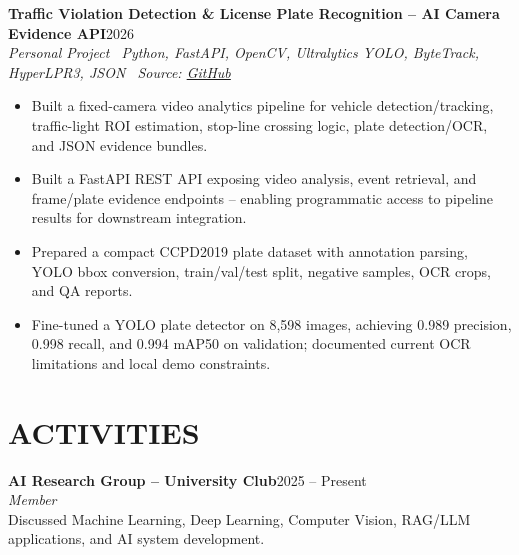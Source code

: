 \documentclass[10pt,a4paper]{article}
\newenvironment{cvitems}{%
    \begin{itemize}[leftmargin=1.2em,itemsep=0pt,topsep=1pt,parsep=0pt]
}{%
    \end{itemize}
}
\newcommand{\entryhead}[2]{%
    \noindent\textbf{#1}\hfill #2\\[-2pt]
}
\newcommand{\entrysub}[1]{%
    \noindent\textit{#1}\\[-1pt]
}
\begin{document}
\entryhead{Traffic Violation Detection \& License Plate Recognition -- AI Camera Evidence API}{2026}
\entrysub{Personal Project \textbar\ Python, FastAPI, OpenCV, Ultralytics YOLO, ByteTrack, HyperLPR3, JSON \textbar\ Source: \href{https://github.com/NguyenKhacBao564/Traffic-Violation-Detection-and-License-Plate-Recognition}{GitHub}}
\begin{cvitems}
    \item Built a fixed-camera video analytics pipeline for vehicle detection/tracking, traffic-light ROI estimation, stop-line crossing logic, plate detection/OCR, and JSON evidence bundles.
    \item Built a FastAPI REST API exposing video analysis, event retrieval, and frame/plate evidence endpoints -- enabling programmatic access to pipeline results for downstream integration.
    \item Prepared a compact CCPD2019 plate dataset with annotation parsing, YOLO bbox conversion, train/val/test split, negative samples, OCR crops, and QA reports.
    \item Fine-tuned a YOLO plate detector on 8,598 images, achieving 0.989 precision, 0.998 recall, and 0.994 mAP50 on validation; documented current OCR limitations and local demo constraints.
\end{cvitems}

\section{ACTIVITIES}
\entryhead{AI Research Group -- University Club}{2025 -- Present}
\entrysub{Member}
Discussed Machine Learning, Deep Learning, Computer Vision, RAG/LLM applications, and AI system development.
\end{document}
